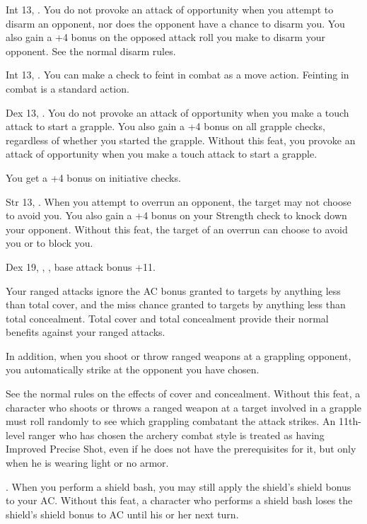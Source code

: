 {}
{Int 13, .}
{You do not provoke an attack of opportunity when you attempt to disarm an opponent, nor does the opponent have a chance to disarm you. You also gain a +4 bonus on the opposed attack roll you make to disarm your opponent.}
{See the normal disarm rules.}{}

{}
{Int 13, .}
{You can make a  check to feint in combat as a move action.}
{Feinting in combat is a standard action.}{}

{}
{Dex 13, .}
{You do not provoke an attack of opportunity when you make a touch attack to start a grapple. You also gain a +4 bonus on all grapple checks, regardless of whether you started the grapple.}
{Without this feat, you provoke an attack of opportunity when you make a touch attack to start a grapple.}{}

{}
{You get a +4 bonus on initiative checks.}

{}
{Str 13, .}
{When you attempt to overrun an opponent, the target may not choose to avoid you. You also gain a +4 bonus on your Strength check to knock down your opponent.}
{Without this feat, the target of an overrun can choose to avoid you or to block you.}{}

{}
{Dex 19, , , base attack bonus +11.}
{Your ranged attacks ignore the AC bonus granted to targets by anything less than total cover, and the miss chance granted to targets by anything less than total concealment. Total cover and total concealment provide their normal benefits against your ranged attacks.

In addition, when you shoot or throw ranged weapons at a grappling opponent, you automatically strike at the opponent you have chosen.}
{See the normal rules on the effects of cover and concealment. Without this feat, a character who shoots or throws a ranged weapon at a target involved in a grapple must roll randomly to see which grappling combatant the attack strikes.}
{An 11th-level ranger who has chosen the archery combat style is treated as having Improved Precise Shot, even if he does not have the prerequisites for it, but only when he is wearing light or no armor.}

{}
{.}
{When you perform a shield bash, you may still apply the shield's shield bonus to your AC.}
{Without this feat, a character who performs a shield bash loses the shield's shield bonus to AC until his or her next turn.}{}


